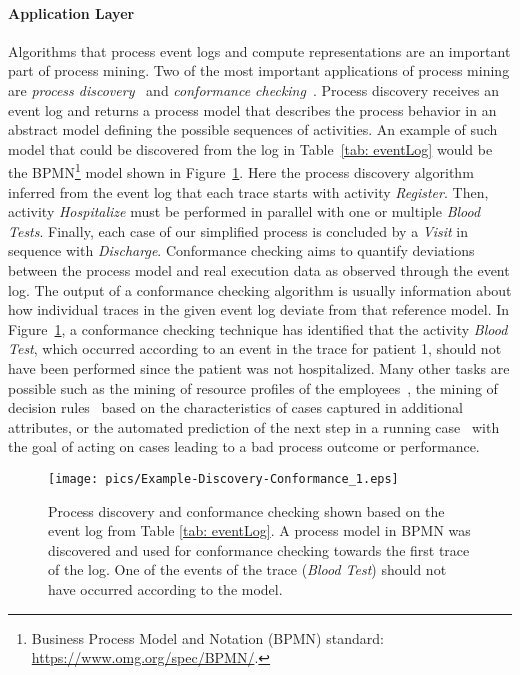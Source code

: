 \documentclass[manuscript]{acmart}
\begin{document}
\paragraph{Application Layer} Algorithms that process event logs and compute representations are an important part of process mining. Two of the most important applications of process mining are \textit{process discovery}~\cite{DBLP:journals/tkde/AugustoCDRMMMS19} and \textit{conformance checking}~\cite{DBLP:books/sp/CarmonaDSW18}. Process discovery receives an event log and returns a process model that describes the process behavior in an abstract model defining the possible sequences of activities. An example of such model that could be discovered from the log in Table~\ref{tab: eventLog} would be the BPMN\footnote{Business Process Model and Notation (BPMN) standard: \url{https://www.omg.org/spec/BPMN/}.} model shown in Figure~\ref{fig:processModel}. Here the process discovery algorithm inferred from the event log that each trace starts with activity \emph{Register}. Then, activity \emph{Hospitalize} must be performed in parallel with one or multiple \emph{Blood Tests}. Finally, each case of our simplified process is concluded by a \emph{Visit} in sequence with \emph{Discharge}. Conformance checking aims to quantify deviations between the process model and real execution data as observed through the event log. The output of a conformance checking algorithm is usually information about how individual traces in the given event log deviate from that reference model. In Figure~\ref{fig:processModel}, a conformance checking technique has identified that the activity \emph{Blood Test}, which occurred according to an event in the trace for patient 1, should not have been performed since the patient was not hospitalized. Many other tasks are possible such as the mining of resource profiles of the employees~\cite{DBLP:journals/tmis/PikaLWFHA17}, the mining of decision rules~\cite{DBLP:books/sp/Aalst16} based on the characteristics of cases captured in additional attributes, or the automated prediction of the next step in a running case~\cite{10.1145/3301300} with the goal of acting on cases leading to a bad process outcome or performance.

\begin{figure}[tb]
    \centering
    \texttt{[image: pics/Example-Discovery-Conformance\_1.eps]}
    \caption{Process discovery and conformance checking shown based on the event log from Table \ref{tab: eventLog}. A process model in BPMN was discovered and used for conformance checking towards the first trace of the log. One of the events of the trace (\emph{Blood Test}) should not have occurred according to the model.}
    \label{fig:processModel}
\end{figure}
\end{document}
